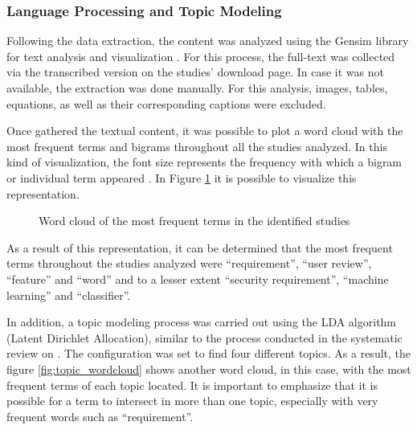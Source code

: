 \documentclass[conference]{IEEEtran}
\newcommand{\quotes}[1]{``#1''}
\begin{document}
\subsubsection{Language Processing and Topic Modeling}

Following the data extraction, the content was analyzed using the Gensim library for text analysis and visualization \cite{rehurek_lrec}. For this process, the full-text was collected via the transcribed version on the studies' download page. In case it was not available, the extraction was done manually. For this analysis, images, tables, equations, as well as their corresponding captions were excluded.

Once gathered the textual content, it was possible to plot a word cloud with the most frequent terms and bigrams throughout all the studies analyzed. In this kind of visualization, the font size represents the frequency with which a bigram or individual term appeared \cite{Cui2010}. In Figure \ref{fig:wordcloud} it is possible to visualize this representation.

\begin{figure}[!htbp]
    \caption{\label{fig:wordcloud}Word cloud of the most frequent terms in the identified studies}
\end{figure}

As a result of this representation, it can be determined that the most frequent terms throughout the studies analyzed were \quotes{requirement}, \quotes{user review}, \quotes{feature} and \quotes{word} and to a lesser extent \quotes{security requirement}, \quotes{machine learning} and \quotes{classifier}.

In addition, a topic modeling process was carried out using the LDA algorithm (Latent Dirichlet Allocation), similar to the process conducted in the systematic review on \cite{Sun2017}. The configuration was set to find four different topics. As a result, the figure \ref{fig:topic_wordcloud} shows another word cloud, in this case, with the most frequent terms of each topic located. It is important to emphasize that it is possible for a term to intersect in more than one topic, especially with very frequent words such as \quotes{requirement}.
\end{document}
